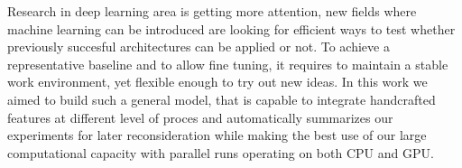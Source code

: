 Research in deep learning area is getting more attention, new fields where machine learning can be introduced are looking for efficient ways to test whether previously succesful architectures can be applied or not.
To achieve a representative baseline and to allow fine tuning, it requires to maintain a stable work environment, yet flexible enough to try out new ideas.
In this work we aimed to build such a general model, that is capable to integrate handcrafted features at different level of proces and automatically summarizes our experiments for later reconsideration while making the best use of our large computational capacity with parallel runs operating on both CPU and GPU.
